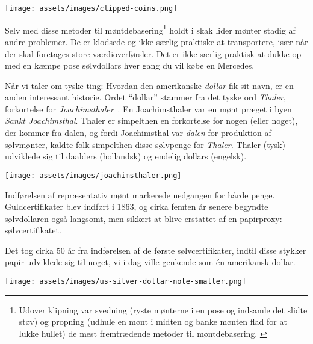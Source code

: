 \begin{center}
  \texttt{[image: assets/images/clipped-coins.png]}
  \label{fig:clipped-coins}
\end{center}

Selv med disse metoder til møntdebasering\footnote{Udover klipning var svedning
(ryste mønterne i en pose og indsamle det slidte støv) og propning
(udhule en mønt i midten og banke mønten flad for at lukke hullet)
de mest fremtrædende metoder til møntdebasering. \cite{wiki:coin-debasement}}
holdt i skak lider mønter stadig af andre problemer. De er klodsede og ikke 
særlig praktiske at transportere, især når der skal foretages store
værdioverførsler. Det er ikke særlig praktisk at dukke op med en kæmpe pose 
sølvdollars hver gang du vil købe en Mercedes.

Når vi taler om tyske ting: Hvordan den amerikanske \textit{dollar} fik sit 
navn, er en anden interessant historie. Ordet \enquote{dollar} stammer fra det 
tyske ord \textit{Thaler}, forkortelse for 
\textit{Joachimsthaler}~\cite{wiki:thaler}. En Joachimsthaler var en mønt
præget i byen \textit{Sankt Joachimsthal}. Thaler er simpelthen en forkortelse 
for nogen (eller noget), der kommer fra dalen, og fordi Joachimsthal var 
\textit{dalen} for produktion af sølvmønter, kaldte folk simpelthen disse 
sølvpenge for \textit{Thaler.} Thaler (tysk) udviklede sig til daalders 
(hollandsk) og endelig dollars (engelsk).


\begin{center}
  \centering
  \texttt{[image: assets/images/joachimsthaler.png]}
  \label{fig:joachimsthaler}
\end{center}

Indførelsen af repræsentativ mønt markerede nedgangen for hårde
penge. Guldcertifikater blev indført i 1863, og cirka femten
år senere begyndte sølvdollaren også langsomt, men sikkert at blive
erstattet af en papirproxy: sølvcertifikatet. \cite{wiki:silver-certificate}

Det tog cirka 50 år fra indførelsen af de første sølvcertifikater, indtil
disse stykker papir udviklede sig til noget, vi i dag ville genkende som én
amerikansk dollar.

\begin{center}
  \centering
  \texttt{[image: assets/images/us-silver-dollar-note-smaller.png]}
  \label{fig:us-silver-dollar-note-smaller}
\end{center}


